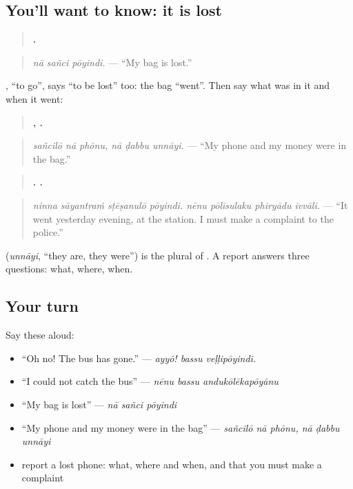 \subsection*{You'll want to know: it is lost}
\begin{quote}
\textbf{  .}
\end{quote}

\begin{quote}
\emph{nā sañci pōyindi.} — \textquotedblleft{}My bag is lost.\textquotedblright{}
\end{quote}

\textbf{}, \textquotedblleft{}to go\textquotedblright{}, says \textquotedblleft{}to be lost\textquotedblright{} too: the bag \textquotedblleft{}went\textquotedblright{}. Then say what was in it and when it went:

\begin{quote}
\textbf{  ,   .}
\end{quote}

\begin{quote}
\emph{sañcilō nā phōnu, nā ḍabbu unnāyi.} — \textquotedblleft{}My phone and my money were in the bag.\textquotedblright{}
\end{quote}

\begin{quote}
\textbf{   .    .}
\end{quote}

\begin{quote}
\emph{ninna sāyantraṁ sṭēṣanulō pōyindi. nēnu pōlīsulaku phiryādu ivvāli.} — \textquotedblleft{}It went yesterday evening, at the station. I must make a complaint to the police.\textquotedblright{}
\end{quote}

\textbf{} (\emph{unnāyi}, \textquotedblleft{}they are, they were\textquotedblright{}) is the plural of \textbf{}. A report answers three questions: what, where, when.

\subsection*{Your turn}
Say these aloud:

\begin{itemize}
\raggedright
  \item \textquotedblleft{}Oh no! The bus has gone.\textquotedblright{} — \emph{ayyō! bassu veḷḷipōyindi.}
  \item \textquotedblleft{}I could not catch the bus\textquotedblright{} — \emph{nēnu bassu andukōlēkapōyānu}
  \item \textquotedblleft{}My bag is lost\textquotedblright{} — \emph{nā sañci pōyindi}
  \item \textquotedblleft{}My phone and my money were in the bag\textquotedblright{} — \emph{sañcilō nā phōnu, nā ḍabbu unnāyi}
  \item report a lost phone: what, where and when, and that you must make a complaint
\end{itemize}

